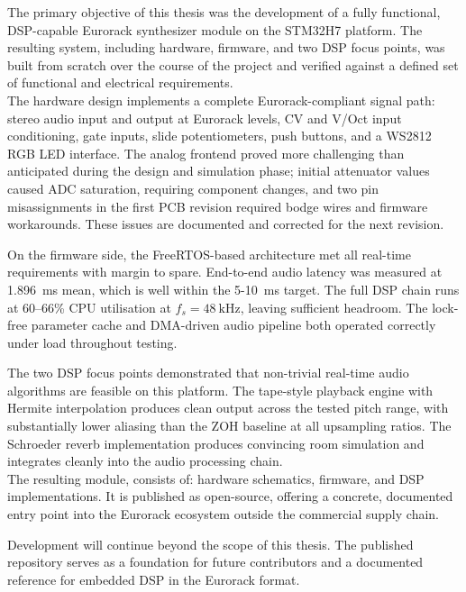 The primary objective of this thesis was the development of a fully functional, DSP-capable Eurorack synthesizer module on the STM32H7 platform.
The resulting system, including hardware, firmware, and two DSP focus points, was built from scratch over the course of the project and verified against a defined set of functional and electrical requirements. \\

The hardware design implements a complete Eurorack-compliant signal path: stereo audio input and output at Eurorack levels, CV and V/Oct input conditioning, gate inputs, slide potentiometers, push buttons, and a WS2812 RGB LED interface.
The analog frontend proved more challenging than anticipated during the design and simulation phase; initial attenuator values caused ADC saturation, requiring component changes, and two pin misassignments in the first PCB revision required bodge wires and firmware workarounds.
These issues are documented and corrected for the next revision.

On the firmware side, the FreeRTOS-based architecture met all real-time requirements with margin to spare.
End-to-end audio latency was measured at \qty{1.896}{ms} mean, which is well within the 5-\qty{10}{ms} target. 
The full DSP chain runs at 60--66\% CPU utilisation at $f_s = \qty{48}{\kilo\hertz}$, leaving sufficient headroom.
The lock-free parameter cache and DMA-driven audio pipeline both operated correctly under load throughout testing.

The two DSP focus points demonstrated that non-trivial real-time audio algorithms are feasible on this platform.
The tape-style playback engine with Hermite interpolation produces clean output across the tested pitch range, with substantially lower aliasing than the ZOH baseline at all upsampling ratios.
The Schroeder reverb implementation produces convincing room simulation and integrates cleanly into the audio processing chain. \\

The resulting module, consists of: hardware schematics, firmware, and DSP implementations. 
It is published as open-source, offering a concrete, documented entry point into the Eurorack ecosystem outside the commercial supply chain.

Development will continue beyond the scope of this thesis. 
The published repository serves as a foundation for future contributors and a documented reference for embedded DSP in the Eurorack format.